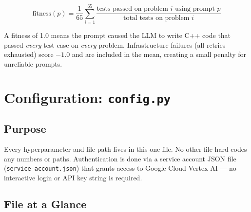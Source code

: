 \documentclass[11pt,a4paper]{report}
\newcommand{\pyfile}[1]{\texttt{#1}}
\newcommand{\fn}[1]{\texttt{#1}}
\begin{document}
\[
\text{fitness}(p) = \frac{1}{65} \sum_{i=1}^{65}
  \frac{\text{tests passed on problem } i \text{ using prompt } p}{\text{total tests on problem } i}
\]

A fitness of 1.0 means the prompt caused the LLM to write C++ code that passed \emph{every}
test case on \emph{every} problem.  Infrastructure failures (all retries exhausted) score $-1.0$
and are included in the mean, creating a small penalty for unreliable prompts.


\chapter{Configuration: \pyfile{config.py}}

\section{Purpose}

Every hyperparameter and file path lives in this one file.  No other file hard-codes any
numbers or paths.  Authentication is done via a service account JSON file
(\fn{service-account.json}) that grants access to Google Cloud Vertex AI --- no interactive
login or API key string is required.

\section{File at a Glance}
\end{document}
